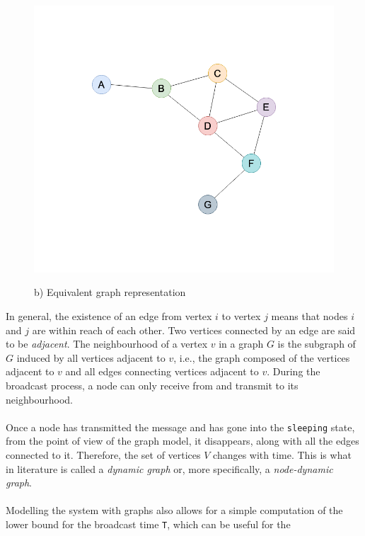 \begin{figure}[H]
\begin{minipage}{.5\textwidth}
		\includegraphics[scale=.23]{img/wireless_graph_2.png}
		\begin{center}
            b) Equivalent graph representation
        \end{center}
	\end{minipage}
	\caption{}
    \label{fig:graph1}
\end{figure}
\noindent
In general, the existence of an edge from vertex $i$ to vertex $j$ means that
nodes $i$ and $j$ are within reach of each other. Two vertices connected by an
edge are said to be \textit{adjacent}. The neighbourhood of a vertex $v$ in a
graph $G$ is the subgraph of $G$ induced by all vertices adjacent to $v$, i.e.,
the graph composed of the vertices adjacent to $v$ and all edges connecting
vertices adjacent to $v$. During the broadcast process, a node can only receive
from and transmit to its neighbourhood.\\
\\
Once a node has transmitted the message and has gone into the \texttt{sleeping}
state, from the point of view of the graph model, it disappears, along with all
the edges connected to it. Therefore, the set of vertices $V$ changes with time.
This is what in literature is called a \textit{dynamic graph} or, more
specifically, a \textit{node-dynamic graph}\cite{harrygraph}.\\
\\
Modelling the system with graphs also allows for a simple computation of the
lower bound for the broadcast time \texttt{T}, which can be useful for the
